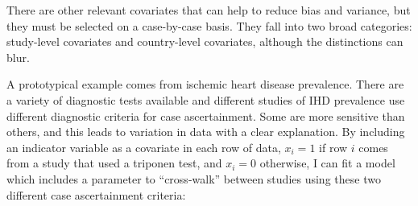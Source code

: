 There are other relevant covariates that can help to reduce bias and
variance, but they must be selected on a case-by-case basis.  They
fall into two broad categories: study-level covariates and
country-level covariates, although the distinctions can blur.

A prototypical example comes from ischemic heart disease prevalence.
There are a variety of diagnostic tests available and different
studies of IHD prevalence use different diagnostic criteria for case
ascertainment.  Some are more sensitive than others, and this leads to
variation in data with a clear explanation.  By including an indicator
variable as a covariate in each row of data, $x_i = 1$ if row $i$
comes from a study that used a triponen test, and $x_i = 0$ otherwise,
I can fit a model which includes a parameter to ``cross-walk'' between
studies using these two different case ascertainment criteria:
